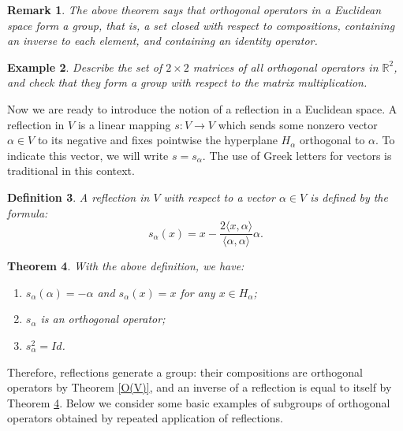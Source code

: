 \documentclass[11pt]{amsart}
\newcommand{\R}{\mathbb R}
\newcommand{\la}{\langle}
\newcommand{\ra}{\rangle}
\newtheorem{theorem}{Theorem}
\newtheorem{definition}[theorem]{Definition}
\newtheorem{remark}[theorem]{Remark}
\newtheorem{example}[theorem]{Example}
\begin{document}
\begin{remark} The above theorem says that orthogonal operators in a 
Euclidean space form a group, that is, a set closed with respect 
to compositions, containing an inverse to each element, and containing an 
identity operator. 
\end{remark} 

\begin{example}  \label{O(2)}
Describe the set of $2 \times 2$ matrices of all orthogonal operators  
in $\R^2$, and check that they form a group with respect to the matrix 
multiplication. 
\end{example} 

Now we are ready to introduce the notion of a reflection in a Euclidean space. 
A reflection in $V$ is a linear mapping $s : V \to V$ which sends some 
nonzero vector $\alpha \in V$ to its negative and fixes pointwise the 
hyperplane $H_\alpha$ orthogonal to $\alpha$. To indicate this vector, 
we will write $s = s_\alpha$. The use of Greek letters for vectors   
is traditional in this context.  

\begin{definition} A \emph{reflection} 
in $V$ with respect to a vector $\alpha \in V$ 
is defined by the formula: 
$$ s_\alpha (x) = 
x -\frac{2 \la x, \alpha \ra }{\la \alpha, \alpha \ra}\alpha. $$
\end{definition} 

\begin{theorem} \label{s_a}
With the above definition, we have: \begin{enumerate}
\item{
$s_\alpha (\alpha ) = -\alpha$ and $s_\alpha(x) = x$ for any 
$x \in H_\alpha$;}
\item{ $s_\alpha$ is an orthogonal operator;}
\item{ $s_\alpha^2 = Id $.} 
\end{enumerate} 
\end{theorem}

Therefore, reflections generate a group: their compositions are orthogonal 
operators by Theorem \ref{O(V)}, and an inverse of a reflection 
is equal to itself by Theorem \ref{s_a}. 
Below we consider some basic examples of subgroups of orthogonal operators 
obtained by repeated application of reflections. 

\end{document}

